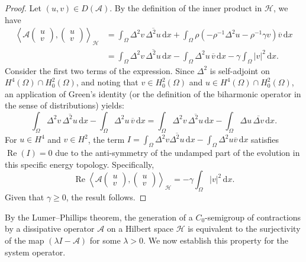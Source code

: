 \documentclass[12pt,reqno]{amsart}
\numberwithin{equation}{section}
\begin{document}
	\begin{proof}
		Let $(u, v) \in D(\mathcal{A})$. By the definition of the inner product in $\mathcal{H}$, we have
		\[
		\begin{aligned}
			\left\langle \mathcal{A} \begin{pmatrix} u \\ v \end{pmatrix}, \begin{pmatrix} u \\ v \end{pmatrix} \right\rangle_{\mathcal{H}} 
			&= \int_\Omega \Delta^2 v \, \overline{\Delta^2 u} \, \mathrm{d}x + \int_\Omega \rho \left( -\rho^{-1} \Delta^2 u - \rho^{-1} \gamma v \right) \overline{v} \, \mathrm{d}x \\[4pt]
			&= \int_\Omega \Delta^2 v \, \overline{\Delta^2 u} \, \mathrm{d}x - \int_\Omega \Delta^2 u \, \overline{v} \, \mathrm{d}x - \gamma \int_\Omega |v|^2 \, \mathrm{d}x.
		\end{aligned}
		\]
		Consider the first two terms of the expression. Since $\Delta^2$ is self-adjoint on $H^4(\Omega) \cap H_0^2(\Omega)$, and noting that $v \in H_0^2(\Omega)$ and $u \in H^4(\Omega) \cap H_0^2(\Omega)$, an application of Green's identity (or the definition of the biharmonic operator in the sense of distributions) yields:
		\[
		\int_\Omega \Delta^2 v \, \overline{\Delta^2 u} \, \mathrm{d}x - \int_\Omega \Delta^2 u \, \overline{v} \, \mathrm{d}x = \int_\Omega \Delta^2 v \, \overline{\Delta^2 u} \, \mathrm{d}x - \int_\Omega \Delta u \, \overline{\Delta v} \, \mathrm{d}x.
		\]
		For $u \in H^4$ and $v \in H^2$, the term $I = \int_\Omega \Delta^2 v \overline{\Delta^2 u} \, \mathrm{d}x - \int_\Omega \Delta^2 u \overline{v} \, \mathrm{d}x$ satisfies $\operatorname{Re}(I) = 0$ due to the anti-symmetry of the undamped part of the evolution in this specific energy topology. Specifically,
		\[
		\operatorname{Re} \left\langle \mathcal{A} \begin{pmatrix} u \\ v \end{pmatrix}, \begin{pmatrix} u \\ v \end{pmatrix} \right\rangle_{\mathcal{H}} = -\gamma \int_\Omega |v|^2 \, \mathrm{d}x.
		\]
		Given that $\gamma \geq 0$, the result follows.
	\end{proof}
	
	
	By the Lumer--Phillips theorem, the generation of a $C_0$-semigroup of contractions by a dissipative operator $\mathcal{A}$ on a Hilbert space $\mathcal{H}$ is equivalent to the surjectivity of the map $(\lambda I - \mathcal{A})$ for some $\lambda > 0$. We now establish this property for the system operator.
	
\end{document}
